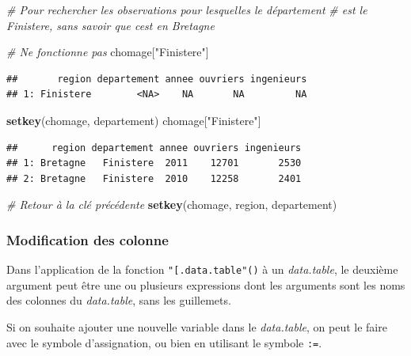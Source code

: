 \documentclass[
  11pt,
]{book}
\newenvironment{Shaded}{\begin{snugshade}}{\end{snugshade}}
\newcommand{\CommentTok}[1]{\textcolor[rgb]{0.56,0.35,0.01}{\textit{#1}}}
\newcommand{\KeywordTok}[1]{\textcolor[rgb]{0.13,0.29,0.53}{\textbf{#1}}}
\newcommand{\NormalTok}[1]{#1}
\newcommand{\StringTok}[1]{\textcolor[rgb]{0.31,0.60,0.02}{#1}}
\numberwithin{equation}{section}
\numberwithin{countremarque}{section}
\begin{document}
\begin{Shaded}
\begin{Highlighting}[]
\CommentTok{\# Pour rechercher les observations pour lesquelles le département}
\CommentTok{\# est le Finistere, sans savoir que c\textquotesingle{}est en Bretagne}

\CommentTok{\# Ne fonctionne pas}
\NormalTok{chomage[}\StringTok{"Finistere"}\NormalTok{]}
\end{Highlighting}
\end{Shaded}

\begin{lstlisting}
##       region departement annee ouvriers ingenieurs
## 1: Finistere        <NA>    NA       NA         NA
\end{lstlisting}

\begin{Shaded}
\begin{Highlighting}[]
\KeywordTok{setkey}\NormalTok{(chomage, departement)}
\NormalTok{chomage[}\StringTok{"Finistere"}\NormalTok{]}
\end{Highlighting}
\end{Shaded}

\begin{lstlisting}
##      region departement annee ouvriers ingenieurs
## 1: Bretagne   Finistere  2011    12701       2530
## 2: Bretagne   Finistere  2010    12258       2401
\end{lstlisting}

\begin{Shaded}
\begin{Highlighting}[]
\CommentTok{\# Retour à la clé précédente}
\KeywordTok{setkey}\NormalTok{(chomage, region, departement)}
\end{Highlighting}
\end{Shaded}

\hypertarget{modification-des-colonne}{%
\subsubsection{Modification des colonne}\label{modification-des-colonne}}

Dans l'application de la fonction \texttt{"{[}.data.table"()} à un \emph{data.table}, le deuxième argument peut être une ou plusieurs expressions dont les arguments sont les noms des colonnes du \emph{data.table}, sans les guillemets.

Si on souhaite ajouter une nouvelle variable dans le \emph{data.table}, on peut le faire avec le symbole d'assignation, ou bien en utilisant le symbole \texttt{:=}.
\end{document}
